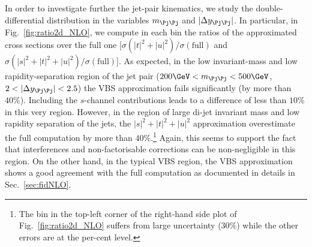 In order to investigate further the jet-pair kinematics, we study the double-differential distribution in the variables $m_{\Pj\Pj}$ and $|\Delta y_{\Pj\Pj}|$.
In particular, in Fig.~\ref{fig:ratio2d_NLO}, we compute in each bin the ratios of the approximated cross sections over the full one [$\sigma(|t|^2+|u|^2)/\sigma(\textrm{full})$ and $\sigma(|s|^2+|t|^2+|u|^2)/\sigma(\textrm{full})$].
As expected, in the low invariant-mass and low rapidity-separation region of the jet pair ($200 \GeV < m_{\Pj\Pj} < 500 \GeV$, $2<|\Delta y_{\Pj\Pj}|<2.5$) the VBS approximation fails significantly (by more than $40\%$).
Including the $s$-channel contributions leads to a difference of less than $10\%$ in this very region.
However, in the region of large di-jet invariant mass and low rapidity separation of the jets, the $|s|^2+|t|^2+|u|^2$ approximation overestimate the full computation by more than $40\%$.\footnote{The bin
in the top-left corner of the right-hand side plot of Fig.~\ref{fig:ratio2d_NLO} suffers from large uncertainty ($30\%$) while the other errors are at the per-cent level.}
Again, this seems to support the fact that interferences and non-factorisable corrections can be non-negligible in this region.
On the other hand, in the typical VBS region, the VBS approximation shows a good agreement with the full computation as documented in details in Sec.~\ref{sec:fidNLO}.

